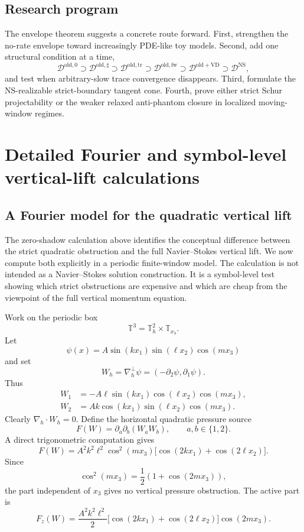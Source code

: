 \documentclass[11pt]{article}
\numberwithin{equation}{section}
\newcommand{\old}{\mathrm{old}}
\newcommand{\trc}{\mathrm{tr}}
\newcommand{\NS}{\mathrm{NS}}
\newcommand{\VD}{\mathrm{VD}}
\newcommand{\divh}{\nabla_h\cdot}
\newcommand{\calD}{\mathcal D}
\begin{document}
\subsection*{Research program}
The envelope theorem suggests a concrete route forward. First, strengthen the no-rate envelope toward increasingly PDE-like toy models. Second, add one structural condition at a time,
\[
  \calD^{\old,0}\supset \calD^{\old,\sharp}\supset \calD^{\old,\trc}\supset \calD^{\old,\mathrm{fw}}\supset \calD^{\old+\VD}\supset \calD^{\NS},
\]
and test when arbitrary-slow trace convergence disappears. Third, formulate the NS-realizable strict-boundary tangent cone. Fourth, prove either strict Schur projectability or the weaker relaxed anti-phantom closure in localized moving-window regimes.



\appendix

\section{Detailed Fourier and symbol-level vertical-lift calculations}\label{app:vertical-lift}

\subsection{A Fourier model for the quadratic vertical lift}\label{subsec:fourier-vcost2}

The zero-shadow calculation above identifies the conceptual difference between the strict quadratic obstruction and the full Navier--Stokes vertical lift.  We now compute both explicitly in a periodic finite-window model.  The calculation is not intended as a Navier--Stokes solution construction.  It is a symbol-level test showing which strict obstructions are expensive and which are cheap from the viewpoint of the full vertical momentum equation.

Work on the periodic box
\[
\mathbb T^3=\mathbb T_h^2\times\mathbb T_{x_3}.
\]
Let
\[
\psi(x)=A\sin(kx_1)\sin(\ell x_2)\cos(mx_3)
\]
and set
\[
W_h=\nabla_h^\perp\psi=(-\partial_2\psi,\partial_1\psi).
\]
Thus
\begin{align}
W_1&=-A\ell\sin(kx_1)\cos(\ell x_2)\cos(mx_3),\label{eq:fourier-W1}\\
W_2&=Ak\cos(kx_1)\sin(\ell x_2)\cos(mx_3).\label{eq:fourier-W2}
\end{align}
Clearly \(\divh W_h=0\).  Define the horizontal quadratic pressure source
\[
F(W)=\partial_a\partial_b(W_aW_b),\qquad a,b\in\{1,2\}.
\]
A direct trigonometric computation gives
\begin{equation}\label{eq:fourier-F}
F(W)=A^2k^2\ell^2\cos^2(mx_3)
\bigl[\cos(2kx_1)+\cos(2\ell x_2)\bigr].
\end{equation}
Since
\[
\cos^2(mx_3)=\frac12(1+\cos(2mx_3)),
\]
the part independent of \(x_3\) gives no vertical pressure obstruction.  The active part is
\begin{equation}\label{eq:fourier-F-z}
F_z(W)=\frac{A^2k^2\ell^2}{2}
\bigl[\cos(2kx_1)+\cos(2\ell x_2)\bigr]\cos(2mx_3).
\end{equation}
\end{document}

